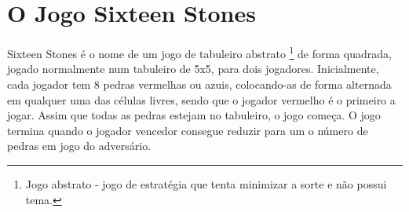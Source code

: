 \documentclass[a4paper]{article}
\begin{document}

\newpage

%
%
%
%
%
%
%


\section{O Jogo Sixteen Stones}

Sixteen Stones é o nome de um jogo de tabuleiro abstrato \footnote{Jogo abstrato - jogo de estratégia que tenta minimizar a sorte e não possui tema.} de forma quadrada, jogado normalmente num tabuleiro de 5x5, para dois jogadores. Inicialmente, cada jogador tem 8 pedras vermelhas ou azuis, colocando-as de forma alternada em qualquer uma das células livres, sendo que o jogador vermelho é o primeiro a jogar. Assim que todas as pedras estejam no tabuleiro, o jogo começa. O jogo termina quando o jogador vencedor consegue reduzir para um o número de pedras em jogo do adversário.
\end{document}
